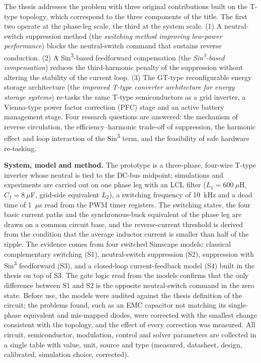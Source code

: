 The thesis addresses the problem with three original contributions built on the T-type topology, which correspond to the three components of the title. The first two operate at the phase-leg scale, the third at the system scale. (1) A neutral-switch suppression method (the \emph{switching method improving low-power performance}) blocks the neutral-switch command that sustains reverse conduction. (2) A Sin\textsuperscript{3}-based feedforward compensation (the \emph{Sin\textsuperscript{3}-based compensation}) reduces the third-harmonic penalty of the suppression without altering the stability of the current loop. (3) The GT-type reconfigurable energy storage architecture (the \emph{improved T-type converter architecture for energy storage systems}) re-tasks the same T-type semiconductors as a grid inverter, a Vienna-type power factor correction (PFC) stage and an active battery management stage. Four research questions are answered: the mechanism of reverse circulation, the efficiency--harmonic trade-off of suppression, the harmonic effect and loop interaction of the Sin\textsuperscript{3} term, and the feasibility of safe hardware re-tasking.

\textbf{System, model and method.} The prototype is a three-phase, four-wire T-type inverter whose neutral is tied to the DC-bus midpoint; simulations and experiments are carried out on one phase leg with an LCL filter ($L_1=600~\mu$H, $C_f=8~\mu$F, grid-side equivalent $L_2$), a switching frequency of 10~kHz and a dead time of 1~$\mu$s read from the PWM timer registers. The switching states, the four basic current paths and the synchronous-buck equivalent of the phase leg are drawn on a common circuit base, and the reverse-current threshold is derived from the condition that the average inductor current is smaller than half of the ripple. The evidence comes from four switched Simscape models: classical complementary switching (S1), neutral-switch suppression (S2), suppression with Sin\textsuperscript{3} feedforward (S3), and a closed-loop current-feedback model (S4) built in the thesis on top of S3. The gate logic read from the models confirms that the only difference between S1 and S2 is the opposite neutral-switch command in the zero state. Before use, the models were audited against the thesis definition of the circuit; the problems found, such as an EMC capacitor not matching its single-phase equivalent and mis-mapped diodes, were corrected with the smallest change consistent with the topology, and the effect of every correction was measured. All circuit, semiconductor, modulation, control and solver parameters are collected in a single table with value, unit, source and type (measured, datasheet, design, calibrated, simulation choice, corrected).

